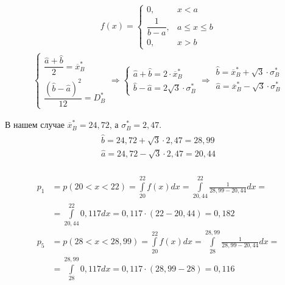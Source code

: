 \documentclass[utf8, a4paper, 14pt, russian, oneside]{book}
\begin{document}
\begin{align*}
    f(x) = \begin{cases}
        0, & x < a \\
        \dfrac{1}{b-a}, & a \leq x \leq b \\
        0, & x > b
    \end{cases}
\end{align*}
\begin{align*}
    \begin{cases}
        \dfrac{\hat{a} + \hat{b}}{2} = \overline{x}^*_B \\
        \dfrac{(\hat{b} - \hat{a})^2}{12} = D^*_B
    \end{cases}
    \Rightarrow
    \begin{cases}
        \hat{a} + \hat{b} = 2 \cdot \overline{x}^*_B \\
        \hat{b} - \hat{a} = 2\sqrt{3} \cdot \sigma^*_B
    \end{cases}
    \Rightarrow
    \begin{array}{l}
        \hat{b} = \overline{x}^*_B + \sqrt{3} \cdot \sigma^*_B \\
        \hat{a} = \overline{x}^*_B - \sqrt{3} \cdot \sigma^*_B \\
    \end{array}
\end{align*}

В нашем случае $\overline{x}^*_B = 24,72$, а $\sigma^*_B = 2,47$.
\begin{align*}
    \begin{array}{l}
        \hat{b} = 24,72 + \sqrt{3} \cdot 2,47 = 28,99\\
        \hat{a} = 24,72 - \sqrt{3} \cdot 2,47 = 20,44\\
    \end{array}
\end{align*}

\begin{align*}
    p_1 &= p(20 < x < 22) = \int\limits_{20}^{22}f(x) dx = \int\limits_{20,44}^{22} \frac{1}{28,99 - 20,44} dx = \\
        &= \int\limits_{20,44}^{22} 0,117 dx = 0,117 \cdot (22 - 20,44) = 0,182 \\
    p_5 &= p(28 < x < 28,99) = \int\limits_{20}^{22}f(x) dx = \int\limits_{28}^{28,99} \frac{1}{28,99 - 20,44} dx = \\
        &= \int\limits_{28}^{28,99} 0,117 dx = 0,117 \cdot (28,99 - 28) = 0,116
\end{align*}
\newpage
\end{document}

